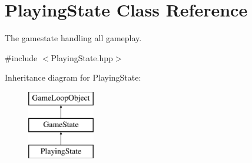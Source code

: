 \hypertarget{class_playing_state}{}\section{Playing\+State Class Reference}
\label{class_playing_state}


The gamestate handling all gameplay.  




{\ttfamily \#include $<$Playing\+State.\+hpp$>$}

Inheritance diagram for Playing\+State\+:\begin{figure}[H]
\begin{center}
\leavevmode
\includegraphics[height=3.000000cm]{class_playing_state}
\end{center}
\end{figure}
